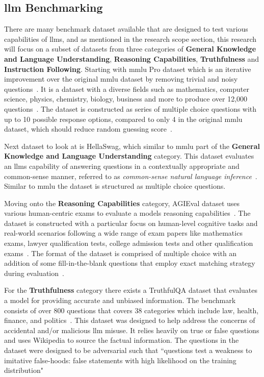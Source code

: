 \documentclass{ifacconf}
\begin{document}
	\subsection{\gls{llm} Benchmarking}
	
	There are many benchmark dataset available that are designed to test various capabilities of \glspl{llm}, and as mentioned in the research scope section, this research will focus on a subset of datasets from three categories of \textbf{General Knowledge and Language Understanding}, \textbf{Reasoning Capabilities}, \textbf{Truthfulness} and \textbf{Instruction Following}. Starting with \gls{mmlu} Pro dataset which is an iterative improvement over the original \gls{mmlu} dataset by removing trivial and noisy questions~\cite{wang2024mmluprorobustchallengingmultitask}. It is a dataset with a diverse fields such as mathematics, computer science, physics, chemistry, biology, business and more to produce over 12,000 questions~\cite{wang2024mmluprorobustchallengingmultitask}. The dataset is constructed as series of multiple choice questions with up to 10 possible response options, compared to only 4 in the original \gls{mmlu} dataset, which should reduce random guessing score~\cite{mmluprohuggingface}.
	
	Next dataset to look at is HellaSwag, which similar to \gls{mmlu} part of the \textbf{General Knowledge and Language Understanding} category. This dataset evaluates an \glspl{llm} capability of answering questions in a contextually appropriate and common-sense manner, referred to as \textit{common-sense natural language inference}~\cite{zellers2019hellaswagmachinereallyfinish}. Similar to \gls{mmlu} the dataset is structured as multiple choice questions.
	
	Moving onto the \textbf{Reasoning Capabilities} category, AGIEval dataset uses various human-centric exams to evaluate a models reasoning capabilities~\cite{zhong2023agievalhumancentricbenchmarkevaluating}. The dataset is constructed with a particular focus on human-level cognitive tasks and real-world scenarios following a wide range of exam papers like mathematics exams, lawyer qualification tests, college admission tests and other qualification exams~\cite[p.~5]{zhong2023agievalhumancentricbenchmarkevaluating}. The format of the dataset is comprised of multiple choice with an addition of some fill-in-the-blank questions that employ exact matching strategy during evaluation~\cite[p.~6]{zhong2023agievalhumancentricbenchmarkevaluating}.
	
	For the \textbf{Truthfulness} category there exists a TruthfulQA dataset that evaluates a model for providing accurate and unbiased information. The benchmark consists of over 800 questions that covers 38 categories which include law, health, finance, and politics~\cite{lin2022truthfulqameasuringmodelsmimic}. This dataset was designed to help address the concerns of accidental and/or malicious \gls{llm} misuse. It relies heavily on true or false questions and uses Wikipedia to source the factual information. The questions in the dataset were designed to be adversarial such that ``questions test a weakness to imitative false-hoods: false statements with high likelihood on the training distribution"~\cite[p.~4]{lin2022truthfulqameasuringmodelsmimic}
	
\end{document}
